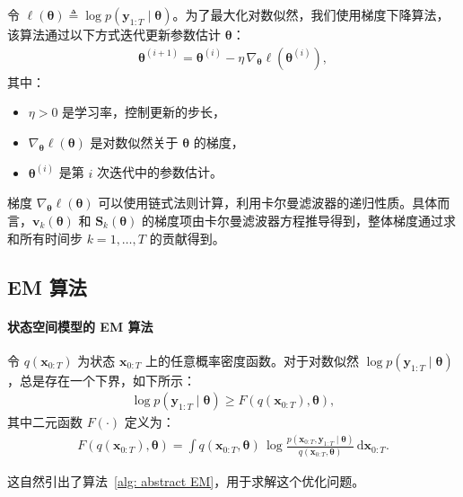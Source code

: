 令 \(\ell(\boldsymbol{\theta}) \triangleq \log p(\mathbf{y}_{1:T} \mid \boldsymbol{\theta})\)。为了最大化对数似然，我们使用梯度下降算法，该算法通过以下方式迭代更新参数估计 \(\boldsymbol{\theta}\)：
\begin{align}
    \boldsymbol{\theta}^{(i+1)} = \boldsymbol{\theta}^{(i)} - \eta \, \nabla_{\boldsymbol{\theta}} \ell(\boldsymbol{\theta}^{(i)}),
\end{align}
其中：
\begin{itemize}
    \item \(\eta > 0\) 是学习率，控制更新的步长，
    \item \(\nabla_{\boldsymbol{\theta}} \ell(\boldsymbol{\theta})\) 是对数似然关于 \(\boldsymbol{\theta}\) 的梯度，
    \item \(\boldsymbol{\theta}^{(i)}\) 是第 \(i\) 次迭代中的参数估计。
\end{itemize}

梯度 \(\nabla_{\boldsymbol{\theta}} \ell(\boldsymbol{\theta})\) 可以使用链式法则计算，利用卡尔曼滤波器的递归性质。具体而言，\(\mathbf{v}_k(\boldsymbol{\theta})\) 和 \(\mathbf{S}_k(\boldsymbol{\theta})\) 的梯度项由卡尔曼滤波器方程推导得到，整体梯度通过求和所有时间步 \(k = 1, \dots, T\) 的贡献得到。

\subsection{EM 算法}
\paragraph*{状态空间模型的 EM 算法}
令 \(q(\mathbf{x}_{0:T})\) 为状态 \(\mathbf{x}_{0:T}\) 上的任意概率密度函数。对于对数似然 \(\log p(\mathbf{y}_{1:T} \mid \boldsymbol{\theta})\)，总是存在一个下界，如下所示：
\begin{align}
    \log p(\mathbf{y}_{1:T} \mid \boldsymbol{\theta}) \ge F(q(\mathbf{x}_{0:T}), \boldsymbol{\theta}), \label{eq: ineq for EM}
\end{align}
其中二元函数 \(F(\cdot)\) 定义为：
\begin{align}
    F(q(\mathbf{x}_{0:T}), \boldsymbol{\theta}) = \int q(\mathbf{x}_{0:T}, \boldsymbol{\theta}) \, \log \frac{p(\mathbf{x}_{0:T}, \mathbf{y}_{1:T} \mid \boldsymbol{\theta})}{q(\mathbf{x}_{0:T}, \boldsymbol{\theta})} \, \mathrm{d} \mathbf{x}_{0:T}.
\end{align}

这自然引出了算法~\ref{alg: abstract EM}，用于求解这个优化问题。

